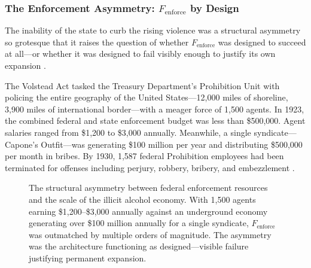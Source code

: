 \subsubsection{The Enforcement Asymmetry: $F_{\text{enforce}}$ by Design}

The inability of the state to curb the rising violence was a structural asymmetry so grotesque that it raises the question of whether $F_{\text{enforce}}$ was designed to succeed at all---or whether it was designed to fail visibly enough to justify its own expansion \cite{mobmuseum_agents}.

The Volstead Act tasked the Treasury Department's Prohibition Unit with policing the entire geography of the United States---12,000 miles of shoreline, 3,900 miles of international border---with a meager force of 1,500 agents. In 1923, the combined federal and state enforcement budget was less than \$500,000. Agent salaries ranged from \$1,200 to \$3,000 annually. Meanwhile, a single syndicate---Capone's Outfit---was generating \$100 million per year and distributing \$500,000 per month in bribes. By 1930, 1,587 federal Prohibition employees had been terminated for offenses including perjury, robbery, bribery, and embezzlement \cite{fjc_prohibition, mobmuseum_agents}.

\begin{figure}[htbp]
\centering
\hspace*{-0.04\textwidth}%
\caption{The structural asymmetry between federal enforcement resources and the scale of the illicit alcohol economy. With 1,500 agents earning \$1,200--\$3,000 annually against an underground economy generating over \$100 million annually for a single syndicate, $F_{\text{enforce}}$ was outmatched by multiple orders of magnitude. The asymmetry was the architecture functioning as designed---visible failure justifying permanent expansion.}
\label{fig:enforcement-asymmetry}
\end{figure}

